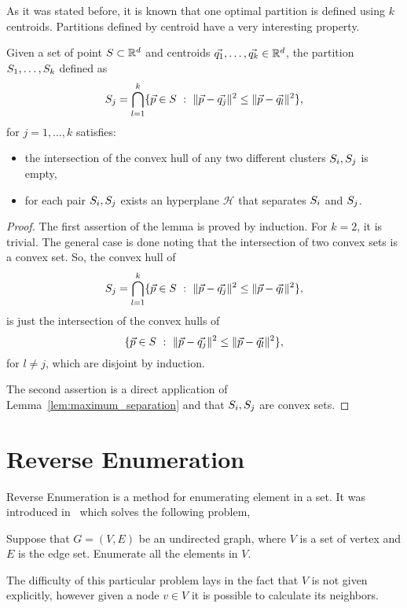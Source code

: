\documentclass{article}
\newcommand{\cH}{\mathcal{H}}
\begin{document}
As it was stated before, it is known that one optimal partition is defined using
$k$ centroids. Partitions defined by centroid have a very interesting
property.
\begin{lemma}
  Given a set of point $S\subset \mathbb{R}^{d}$ and centroids
  $\vec{q_1},\ldots,\vec{q_k}\in\mathbb{R}^d$, the partition $S_1,\ldots,
  S_k$ defined as 
  \begin{equation*}
    \Set_j=\bigcap_{l=1}^{k}\{\vec{p}\in\Set\ :\ 
    \|\vec{p}-\vec{q_j}\|^2\le \|\vec{p}-\vec{q_l}\|^2\},
  \end{equation*}
  for $j = 1,\ldots, k$ satisfies:
  \begin{itemize}
  \item the intersection of the convex hull of any two different
    clusters $S_i,S_j$ is empty,
  \item for each pair $S_i, S_j$ exists an hyperplane $\cH$ that 
    separates $S_i$ and $S_j$.
  \end{itemize}
\end{lemma}
\begin{proof}
  The first assertion of the lemma is proved by induction. For $k=2$,
  it is trivial. The general case is done noting that the intersection
  of two convex sets is a convex set. So, the convex hull of 
  \begin{equation*}
    \Set_j=\bigcap_{l=1}^{k}\{\vec{p}\in\Set\ :\ 
    \|\vec{p}-\vec{q_j}\|^2\le \|\vec{p}-\vec{q_l}\|^2\},
  \end{equation*}
  is just the intersection of the convex hulls of 
  \begin{equation*}
    \{\vec{p}\in\Set\ :\ 
    \|\vec{p}-\vec{q_j}\|^2\le \|\vec{p}-\vec{q_l}\|^2\},
  \end{equation*}
  for $l\neq j$, which are disjoint by induction.

  The second assertion is a direct application of
  Lemma~\ref{lem:maximum_separation} and that $S_i, S_j$ are
  convex sets. 
\end{proof}

\section{Reverse Enumeration}
\label{sec:reverse_enumeration}
Reverse Enumeration is a method for enumerating element in a set. It
was introduced in~\cite{AvisFukuda} which solves the following
problem,
\begin{problem}
  \label{prob:traversal}
  Suppose that $G = (V, E)$ be an undirected graph, where $V$ is a set
  of vertex and $E$ is the edge set. Enumerate all the elements in $V$. 
\end{problem}
The difficulty of this particular problem lays in the fact that $V$
is  not given explicitly, however given a node $v\in V$ it is possible
to calculate its neighbors.
\end{document}
